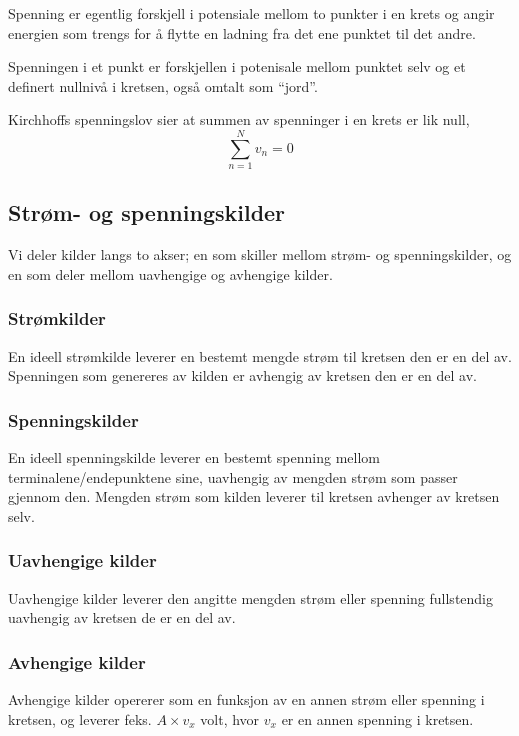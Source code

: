 \documentclass[norsk, a4paper, 12pt, twoside, titlepage]{article}
\begin{document}
Spenning er egentlig forskjell i potensiale mellom to punkter i en
krets og angir energien som trengs for å flytte en ladning fra det ene
punktet til det andre.

Spenningen i et punkt er forskjellen i potenisale mellom punktet selv
og et definert nullnivå i kretsen, også omtalt som ``jord''.

Kirchhoffs spenningslov sier at summen av spenninger i en krets er lik null,
\begin{equation}
\sum_{n=1}^{N}v_{n} = 0
\end{equation}


\subsection{Strøm- og spenningskilder}
Vi deler kilder langs to akser; en som skiller mellom strøm- og
spenningskilder, og en som deler mellom uavhengige og avhengige kilder.

\subsubsection{Strømkilder}
En ideell strømkilde leverer en bestemt mengde strøm til kretsen den
er en del av.  Spenningen som genereres av kilden er avhengig av
kretsen den er en del av.

\subsubsection{Spenningskilder}
En ideell spenningskilde leverer en bestemt spenning mellom
terminalene/endepunktene sine, uavhengig av mengden strøm som passer
gjennom den.  Mengden strøm som kilden leverer til kretsen avhenger av
kretsen selv.

\subsubsection{Uavhengige kilder}
Uavhengige kilder leverer den angitte mengden strøm eller spenning
fullstendig uavhengig av kretsen de er en del av.

\subsubsection{Avhengige kilder}
Avhengige kilder opererer som en funksjon av en annen strøm eller
spenning i kretsen, og leverer feks. $A \times v_{x}$ volt, hvor
$v_{x}$ er en annen spenning i kretsen.
\end{document}
